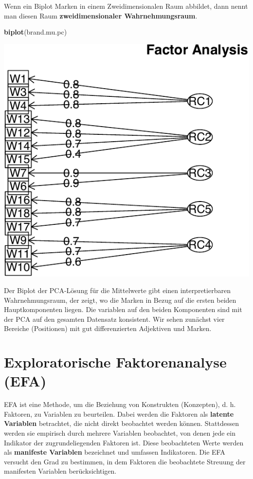 \documentclass[12pt,]{book}
\newenvironment{Shaded}{\begin{snugshade}}{\end{snugshade}}
\newcommand{\KeywordTok}[1]{\textcolor[rgb]{0.13,0.29,0.53}{\textbf{{#1}}}}
\newcommand{\NormalTok}[1]{{#1}}
\begin{document}
Wenn ein Biplot Marken in einem Zweidimensionalen Raum abbildet, dann
nennt man diesen Raum \textbf{zweidimensionaler Wahrnehmungsraum}.

\begin{Shaded}
\begin{Highlighting}[]
\KeywordTok{biplot}\NormalTok{(brand.mu.pc)}
\end{Highlighting}
\end{Shaded}

\begin{center}\includegraphics[width=0.7\linewidth]{083_Dimensionsreduktion_files/figure-latex/unnamed-chunk-16-1} \end{center}

Der Biplot der PCA-Lösung für die Mittelwerte gibt einen
interpretierbaren Wahrnehmungsraum, der zeigt, wo die Marken in Bezug
auf die ersten beiden Hauptkomponenten liegen. Die variablen auf den
beiden Komponenten sind mit der PCA auf den gesamten Datensatz
konsistent. Wir sehen zunächst vier Bereiche (Positionen) mit gut
differenzierten Adjektiven und Marken.

\section{Exploratorische Faktorenanalyse
(EFA)}\label{exploratorische-faktorenanalyse-efa}

EFA ist eine Methode, um die Beziehung von Konstrukten (Konzepten), d.
h. Faktoren, zu Variablen zu beurteilen. Dabei werden die Faktoren als
\textbf{latente Variablen} betrachtet, die nicht direkt beobachtet
werden können. Stattdessen werden sie empirisch durch mehrere Variablen
beobachtet, von denen jede ein Indikator der zugrundeliegenden Faktoren
ist. Diese beobachteten Werte werden als \textbf{manifeste Variablen}
bezeichnet und umfassen Indikatoren. Die EFA versucht den Grad zu
bestimmen, in dem Faktoren die beobachtete Streuung der manifesten
Variablen berücksichtigen.
\end{document}
